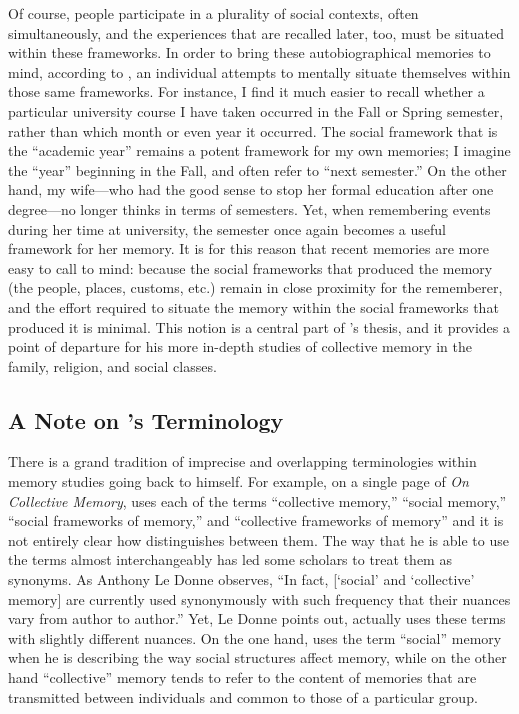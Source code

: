 Of course, people participate in a plurality of social contexts, often simultaneously, and the experiences that are recalled later, too, must be situated within these frameworks. In order to bring these autobiographical memories to mind, according to \halbwachs, an individual attempts to mentally situate themselves within those same frameworks.%
    \autocite[38]{halbwachs1992}
For instance, I find it much easier to recall whether a particular university course I have taken occurred in the Fall or Spring semester, rather than which month or even year it occurred. The social framework that is the ``academic year'' remains a potent framework for my own memories; I imagine the ``year'' beginning in the Fall, and often refer to ``next semester.'' On the other hand, my wife---who had the good sense to stop her formal education after one degree---no longer thinks in terms of semesters. Yet, when remembering events during her time at university, the semester once again becomes a useful framework for her memory. It is for this reason that recent memories are more easy to call to mind: because the social frameworks that produced the memory (the people, places, customs, etc.) remain in close proximity for the rememberer, and the effort required to situate the memory within the social frameworks that produced it is minimal.%
    \autocite[52]{halbwachs1992}
This notion is a central part of \halbwachs's thesis, and it provides a point of departure for his more in-depth studies of collective memory in the family, religion, and social classes.  

\subsection{A Note on \halbwachs's Terminology}

There is a grand tradition of imprecise and overlapping terminologies within memory studies going back to \halbwachs himself. For example, on a single page of \emph{On Collective Memory}, \halbwachs uses each of the terms ``collective memory,'' ``social memory,'' ``social frameworks of memory,'' and ``collective frameworks of memory'' and it is not entirely clear how \halbwachs distinguishes between them.%
    \autocite[40]{halbwachs1992}
The way that he is able to use the terms almost interchangeably has led some scholars to treat them as synonyms. As Anthony Le Donne observes, ``In fact, {[}`social' and `collective' memory{]} are currently used synonymously with such frequency that their nuances vary from author to author.''%
    \autocite[42 n.8]{ledonne2009}
Yet, Le Donne points out, \halbwachs actually uses these terms with slightly different nuances. On the one hand, \halbwachs uses the term ``social'' memory when he is describing the way social structures affect memory, while on the other hand ``collective'' memory tends to refer to the content of memories that are transmitted between individuals and common to those of a particular group.  

